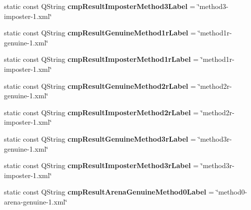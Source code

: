 \begin{DoxyCompactItemize}
\item 
\hypertarget{class_common_a5894c40a0edcd2419021cea19ccf8eb3}{static const Q\+String {\bfseries cmp\+Result\+Imposter\+Method3\+Label} = \char`\"{}method3-\/imposter-\/1.xml\char`\"{}}\label{class_common_a5894c40a0edcd2419021cea19ccf8eb3}

\item 
\hypertarget{class_common_a8b005149dc0ebe38354f5ce8d48188ad}{static const Q\+String {\bfseries cmp\+Result\+Genuine\+Method1r\+Label} = \char`\"{}method1r-\/genuine-\/1.xml\char`\"{}}\label{class_common_a8b005149dc0ebe38354f5ce8d48188ad}

\item 
\hypertarget{class_common_ab324a547cd09aff66d135c388425516d}{static const Q\+String {\bfseries cmp\+Result\+Imposter\+Method1r\+Label} = \char`\"{}method1r-\/imposter-\/1.xml\char`\"{}}\label{class_common_ab324a547cd09aff66d135c388425516d}

\item 
\hypertarget{class_common_ab62e2e57445402fdf35cb4cfbf4a4101}{static const Q\+String {\bfseries cmp\+Result\+Genuine\+Method2r\+Label} = \char`\"{}method2r-\/genuine-\/1.xml\char`\"{}}\label{class_common_ab62e2e57445402fdf35cb4cfbf4a4101}

\item 
\hypertarget{class_common_a8ce3cbdbb687b9e84a722a661f153711}{static const Q\+String {\bfseries cmp\+Result\+Imposter\+Method2r\+Label} = \char`\"{}method2r-\/imposter-\/1.xml\char`\"{}}\label{class_common_a8ce3cbdbb687b9e84a722a661f153711}

\item 
\hypertarget{class_common_a856891acac57f889dbe597a87278c879}{static const Q\+String {\bfseries cmp\+Result\+Genuine\+Method3r\+Label} = \char`\"{}method3r-\/genuine-\/1.xml\char`\"{}}\label{class_common_a856891acac57f889dbe597a87278c879}

\item 
\hypertarget{class_common_aaf78625cfb0be6b5e515498ad3fced94}{static const Q\+String {\bfseries cmp\+Result\+Imposter\+Method3r\+Label} = \char`\"{}method3r-\/imposter-\/1.xml\char`\"{}}\label{class_common_aaf78625cfb0be6b5e515498ad3fced94}

\item 
\hypertarget{class_common_ab369067e5c4c3b2414ce2baeed44f745}{static const Q\+String {\bfseries cmp\+Result\+Arena\+Genuine\+Method0\+Label} = \char`\"{}method0-\/arena-\/genuine-\/1.xml\char`\"{}}\label{class_common_ab369067e5c4c3b2414ce2baeed44f745}


\end{DoxyCompactItemize}
